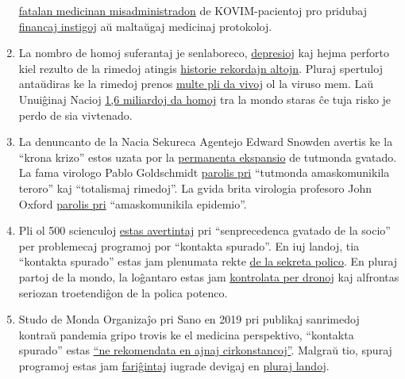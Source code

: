 \begin{enumerate}
  \href{https://www.youtube.com/watch?v=UIDsKdeFOmQ}{fatalan medicinan
  misadministradon} de KOVIM-pacientoj pro pridubaj
  \href{https://eu.usatoday.com/story/news/factcheck/2020/04/24/fact-check-medicare-hospitals-paid-more-covid-19-patients-coronavirus/3000638001/}{financaj
  instigoj} aŭ maltaŭgaj medicinaj protokoloj.
\item
  La nombro de homoj suferantaj je senlaboreco,
  \href{https://www.indystar.com/story/news/health/2020/04/03/coronavirus-indiana-how-get-help-mental-health-addiction/5104357002/}{depresioj}
  kaj hejma perforto kiel rezulto de la rimedoj atingis
  \href{https://www.businessinsider.com/us-weekly-jobless-claims-unemployment-filings-coronavirus-labor-market-layoffs-2020-5}{historie
  rekordajn altojn}. Pluraj spertuloj antaŭdiras ke la rimedoj prenos
  \href{https://www.nytimes.com/2020/03/20/opinion/coronavirus-pandemic-social-distancing.html}{multe
  pli da vivoj} ol la viruso mem. Laŭ Unuiĝinaj Nacioj
  \href{https://www.theguardian.com/world/2020/apr/29/half-of-worlds-workers-at-immediate-risk-of-losing-livelihood-due-to-coronavirus}{1,6
  miliardoj da homoj} tra la mondo staras ĉe tuja risko je perdo de sia
  vivtenado.
\item
  La denuncanto de la Nacia Sekureca Agentejo Edward Snowden avertis ke
  la ``krona krizo'' estos uzata por la
  \href{https://www.youtube.com/watch?v=-pcQFTzck_c}{permanenta
  ekspansio} de tutmonda gvatado. La fama virologo Pablo Goldschmidt
  \href{https://www.rubikon.news/artikel/der-corona-totalitarismus}{parolis
  pri} ``tutmonda amaskomunikila teroro'' kaj ``totalismaj rimedoj''. La
  gvida brita virologia profesoro John Oxford
  \href{https://novuscomms.com/2020/03/31/a-view-from-the-hvivo-open-orphan-orph-laboratory-professor-john-oxford/}{parolis
  pri} ``amaskomunikila epidemio''.
\item
  Pli ol 500 scienculoj
  \href{https://www.esat.kuleuven.be/cosic/sites/contact-tracing-joint-statement/}{estas
  avertintaj} pri ``senprecedenca gvatado de la socio'' per problemecaj
  programoj por ``kontakta spurado''. En iuj landoj, tia ``kontakta
  spurado'' estas jam plenumata rekte
  \href{https://www.jewishpress.com/news/the-courts/state-to-high-court-even-more-shin-bet-involvement-in-fighting-the-coronavirus/2020/04/14/}{de
  la sekreta polico}. En pluraj partoj de la mondo, la loĝantaro estas
  jam
  \href{https://off-guardian.org/2020/04/25/50-headlines-darker-more-of-the-new-normal/}{kontrolata
  per dronoj} kaj alfrontas seriozan troetendiĝon de la polica potenco.
\item
  Studo de Monda Organizaĵo pri Sano en 2019 pri publikaj sanrimedoj
  kontraŭ pandemia gripo trovis ke el medicina perspektivo, ``kontakta
  spurado'' estas
  \href{https://apps.who.int/iris/bitstream/handle/10665/329438/9789241516839-eng.pdf\#page=9}{``ne
  rekomendata en ajnaj cirkonstancoj''}. Malgraŭ tio, spuraj programoj
  estas jam
  \href{https://www.heise.de/tp/features/CuidAR-Argentinien-ueberwacht-mit-einer-App-4720143.html}{fariĝintaj}
  iugrade devigaj en
  \href{https://www.technologyreview.com/2020/05/07/1001360/india-aarogya-setu-covid-app-mandatory/}{pluraj
  landoj}.
\end{enumerate}

